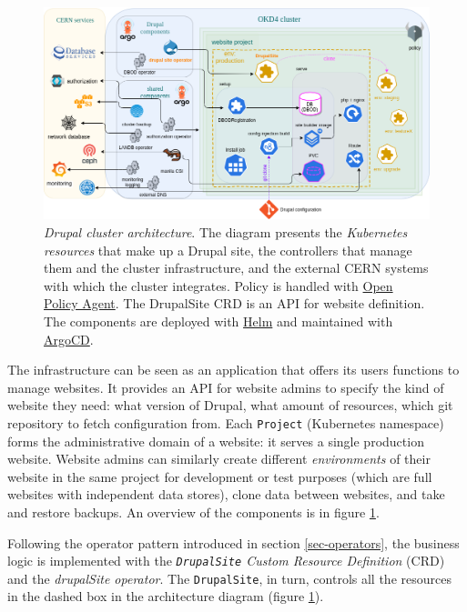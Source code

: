 \begin{figure}[t]
    \centering
    \includegraphics[width=.95\textwidth]{figures/drupal-architecture}
    \vspace{-1em}
    \caption{\emph{Drupal cluster architecture}.
    The diagram presents the \emph{Kubernetes resources} that {\color{darkseagreen} make up a Drupal site},
    the {\color{carolinablue} controllers} that manage them and the cluster infrastructure,
    and the {\color{beige} external CERN systems} with which the cluster integrates.
    Policy is handled with \href{https://www.openpolicyagent.org/}{Open Policy Agent}.
    The {\color{fluorescentorange} DrupalSite CRD} is an API for website definition.
    The components are deployed with \href{https://helm.sh/}{Helm} and maintained with \href{https://argo-cd.readthedocs.io/en/stable/}{ArgoCD}.}
    \label{fig:drupal-architecture}
    \vspace{-2em}
\end{figure}

The infrastructure can be seen as an application that offers its users functions to manage websites.
It provides an API for website admins to specify the kind of website they need: what version of Drupal, what amount of resources, which git repository to fetch configuration from.
Each \texttt{Project} (Kubernetes namespace) forms the administrative domain of a website: it serves a single production website.
Website admins can similarly create different \emph{environments} of their website in the same project for development or test purposes (which are full websites with independent data stores),
clone data between websites, and take and restore backups.
An overview of the components is in figure \ref{fig:drupal-architecture}.

Following the operator pattern introduced in section \ref{sec-operators}, the business logic is implemented with the \emph{\texttt{DrupalSite} Custom Resource Definition} (CRD) and the \emph{drupalSite operator}.
The \texttt{DrupalSite}, in turn, controls all the resources in the { \color{fluorescentorange} dashed box } in the architecture diagram (figure \ref{fig:drupal-architecture}).

